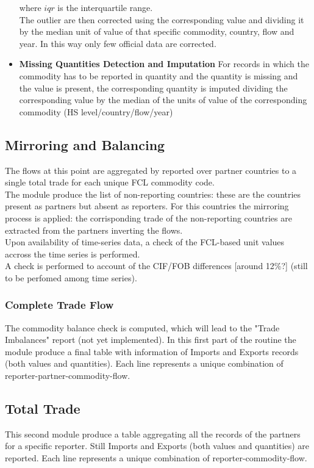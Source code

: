 \documentclass[nojss]{jss}\usepackage[]{graphicx}\usepackage[]{color}
\begin{document}
\begin{itemize}
\begin{itemize}
\begin{equation}
\end{equation}
\end{itemize}
where $iqr$ is the interquartile range.\\
The outlier are then corrected using the corresponding value and dividing it by the median unit of value of that specific commodity, country, flow and year. In this way only few official data are corrected.
\item {\bf Missing Quantities Detection and Imputation} For records in which the commodity has to be reported in quantity and the quantity is missing and the value is present, the corresponding quantity is imputed dividing the corresponding value by the median of the units of value of the corresponding commodity (HS level/country/flow/year)
\end{itemize}

\subsection{Mirroring and Balancing}
The flows at this point are aggregated by reported over partner countries to a single total trade for each unique FCL commodity code.\\
The module produce the list of non-reporting countries: these are the countries present as partners but absent as reporters. For this countries the mirroring process is applied: the corrisponding trade of the non-reporting countries are extracted from the partners inverting the flows.\\
Upon availability of time-series data, a check of the FCL-based unit values accross the time series is performed.\\
A check is performed to account of the CIF/FOB differences [around 12\%?] (still to be perfomed among time series).

\subsubsection{Complete Trade Flow}
The commodity balance check is computed, which will lead to the "Trade Imbalances" report (not yet implemented).
In this first part of the routine the module produce a final table with information of Imports and Exports records (both values and quantities). Each line represents a unique combination of reporter-partner-commodity-flow.

\subsection{Total Trade}
This second module produce a table aggregating all the records of the partners for a specific reporter. Still Imports and Exports (both values and quantities) are reported. Each line represents a unique combination of reporter-commodity-flow.
\end{document}
